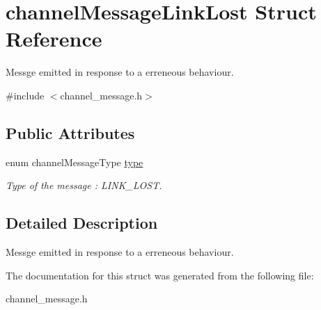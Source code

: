 \hypertarget{structchannelMessageLinkLost}{\section{channel\-Message\-Link\-Lost Struct Reference}
\label{structchannelMessageLinkLost}
}


Messge emitted in response to a erreneous behaviour.  




{\ttfamily \#include $<$channel\-\_\-message.\-h$>$}

\subsection*{Public Attributes}
\begin{DoxyCompactItemize}
\item 
\hypertarget{structchannelMessageLinkLost_a02aebaccb67e32fa4b5df28248b0e794}{enum channel\-Message\-Type \hyperlink{structchannelMessageLinkLost_a02aebaccb67e32fa4b5df28248b0e794}{type}}\label{structchannelMessageLinkLost_a02aebaccb67e32fa4b5df28248b0e794}

\begin{DoxyCompactList}\small\item\em Type of the message \-: L\-I\-N\-K\-\_\-\-L\-O\-S\-T. \end{DoxyCompactList}\end{DoxyCompactItemize}


\subsection{Detailed Description}
Messge emitted in response to a erreneous behaviour. 

The documentation for this struct was generated from the following file\-:\begin{DoxyCompactItemize}
\item 
channel\-\_\-message.\-h\end{DoxyCompactItemize}
